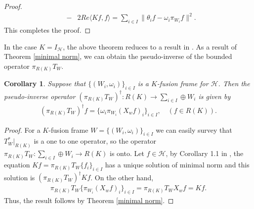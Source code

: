 \documentclass{birkjour}
\newtheorem{cor}[thm]{Corollary}
\theoremstyle{definition}
\theoremstyle{remark}
\numberwithin{equation}{section}
\begin{document}
\begin{proof}
\begin{eqnarray*}
&-& 2  Re\langle Kf, f\rangle
= \sum_{i\in I}\|\theta_{i}f-\omega_{i}\pi_{W_{i}}f\|^2.
\end{eqnarray*}
This completes the proof.
\end{proof}
 In the  case $K=I_{\mathcal{H}}$, the above theorem reduces
to a result in \cite{khosravi15}. As a result of  Theorem \ref{minimal norm}, we can obtain  the pseudo-inverse of  the bounded operator $\pi_{R(K)}T_{W}$.
\begin{cor}
Suppose that $\lbrace
(W_{i},\omega_{i})\rbrace_{i\in I}$ is a $K$-fusion frame for $\mathcal{H}$. Then the pseudo-inverse operator $(\pi_{R(K)}T_{W})^{\dagger}: R(K)\rightarrow \sum_{i\in I}\oplus W_{i}$ is given by
\begin{eqnarray*}
(\pi_{R(K)}T_{W})^{\dagger}f = \{\omega_{i}\pi_{W_i}(X_{w}f)_{i}\}_{i\in I}, \quad (f\in R(K)).
\end{eqnarray*}
\end{cor}
\begin{proof}
For a $K$-fusion frame $W = \lbrace
(W_{i},\omega_{i})\rbrace_{i\in I}$ we can easily survey that $T_{W}^{*}\vert_{R(K)}$ is a one to one operator, so the operator $\pi_{R(K)}T_{W}:  \sum_{i\in I}\oplus W_{i} \rightarrow R(K)$ is onto. Let $f\in \mathcal{H}$, by Corollary 1.1  in \cite{Berut76},  the equation
$Kf = \pi_{R(K)}T_{W}\{f_{i}\}_{i\in I}$ has a unique solution of  minimal norm and this solution is $(\pi_{R(K)}T_{W})^{\dagger}Kf$. On the other hand,
\begin{eqnarray*}
\pi_{R(K)}T_{W} \{\pi_{W_i}(X_{w}f)_{i}\}_{i\in I} 
= \pi_{R(K)}T_{W}X_{w}f =Kf.
\end{eqnarray*}
Thus,  the result follows  by Theorem \ref{minimal norm}.
\end{proof}
\end{document}
